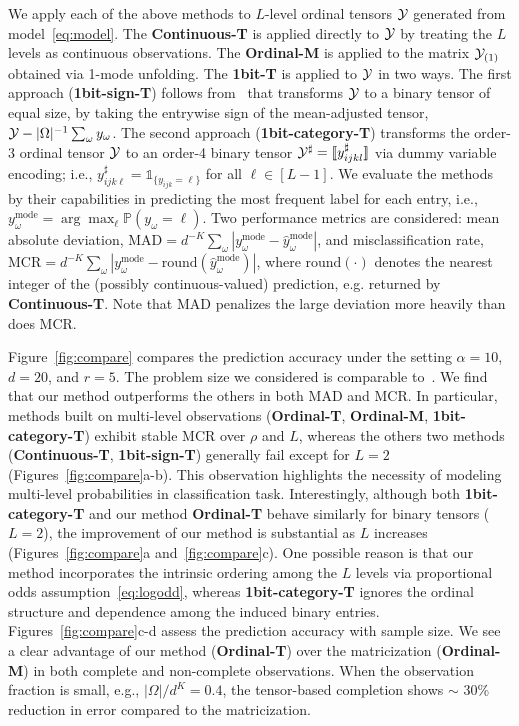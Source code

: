 \documentclass{article}
\theoremstyle{plain}
\theoremstyle{definition}
\begin{document}
We apply each of the above methods to $L$-level ordinal tensors $\mathcal{Y}$ generated from model~\eqref{eq:model}. The {\bf Continuous-T} is applied directly to $\mathcal{Y}$ by treating the $L$ levels as continuous observations. The {\bf Ordinal-M} is applied to the matrix $\mathcal{Y}_{(1)}$ obtained via 1-mode unfolding. The {\bf 1bit-T} is applied to $\mathcal{Y}$ in two ways. The first approach ({\bf 1bit-sign-T}) follows from~\citet{ghadermarzy2018learning} that transforms $\mathcal{Y}$ to a binary tensor of equal size, by taking the entrywise sign of the mean-adjusted tensor, $\mathcal{Y}- |\Omega|^{-1}\sum_\omega y_\omega$. The second approach ({\bf 1bit-category-T}) transforms the order-3 ordinal tensor $\mathcal{Y}$ to an order-4 binary tensor $\mathcal{Y}^{\sharp}=\llbracket y^{\sharp}_{ijkl} \rrbracket$ via dummy variable encoding; i.e., $y^{\sharp}_{ijk\ell}=\mathds{1}_{\{y_{ijk}=\ell\}}$ for all $\ell\in[L-1]$. We evaluate the methods by their capabilities in predicting the most frequent label for each entry, i.e.,\ $y_\omega^{\text{mode}}=\arg\max_\ell\mathbb{P}(y_\omega=\ell)$. Two performance metrics are considered: mean absolute deviation, $\text{MAD}=d^{-K}\sum_\omega |y_\omega^{\text{mode}}-\hat y_\omega^{\text{mode}}|$, and misclassification rate, $\text{MCR}=d^{-K}\sum_\omega|y_\omega^{\text{mode}}-\text{round}(\hat y_\omega^{\text{mode}})|$, where $\text{round}(\cdot)$ denotes the nearest integer of the (possibly continuous-valued) prediction, e.g. returned by {\bf Continuous-T}. Note that MAD penalizes the large deviation more heavily than does MCR. 


Figure~\ref{fig:compare} compares the prediction accuracy under the setting $\alpha=10$, $d=20$, and $r=5$. The problem size we considered is comparable to~\citet{ghadermarzy2018learning}. We find that our method outperforms the others in both MAD and MCR. In particular, methods built on multi-level observations ({\bf Ordinal-T}, {\bf Ordinal-M}, {\bf 1bit-category-T}) exhibit stable MCR over $\rho$ and $L$, whereas the others two methods ({\bf Continuous-T}, {\bf 1bit-sign-T}) generally fail except for $L=2$ (Figures~\ref{fig:compare}a-b). This observation highlights the necessity of modeling multi-level probabilities in classification task. Interestingly, although both {\bf 1bit-category-T} and our method {\bf Ordinal-T} behave similarly for binary tensors ($L=2$), the improvement of our method is substantial as $L$ increases (Figures~\ref{fig:compare}a and~\ref{fig:compare}c). One possible reason is that our method incorporates the intrinsic ordering among the $L$ levels via proportional odds assumption~\eqref{eq:logodd}, whereas {\bf 1bit-category-T} ignores the ordinal structure and dependence among the induced binary entries. Figures~\ref{fig:compare}c-d assess the prediction accuracy with sample size. We see a clear advantage of our method ({\bf Ordinal-T}) over the matricization ({\bf Ordinal-M}) in both complete and non-complete observations. When the observation fraction is small, e.g., ${|\Omega|/ d^K}=0.4$, the tensor-based completion shows $\sim$ 30\% reduction in error compared to the matricization. 
\end{document}
